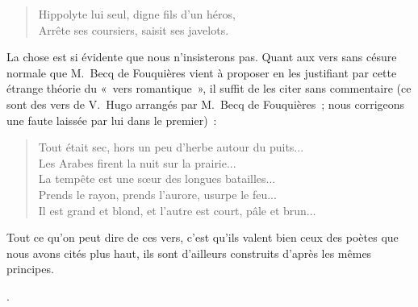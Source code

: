 \documentclass[french,twoside]{book} %
\begin{document}
{\begin{verse}
Hippolyte lui seul, digne fils d’un héros,\\
Arrête ses coursiers, saisit ses javelots.\\
\end{verse}
\par
\noindent La chose est si évidente que nous n’insisterons pas. Quant aux vers sans césure normale que M. Becq de Fouquières vient à proposer en les justifiant par cette étrange théorie du « vers romantique », il suffit de les citer sans commentaire (ce sont des vers de V. Hugo arrangés par M. Becq de Fouquières ; nous corrigeons une faute laissée par lui dans le premier) :\par

\begin{verse}
Tout était sec, hors un peu d’herbe autour du puits...\\
Les Arabes firent la nuit sur la prairie...\\
La tempête est une sœur des longues batailles...\\
Prends le rayon, prends l’aurore, usurpe le feu...\\
Il est grand et blond, et l’autre est court, pâle et brun...\\
\end{verse}
\par
\noindent Tout ce qu’on peut dire de ces vers, c’est qu’ils valent bien ceux des poètes que nous avons cités plus haut, ils sont d’ailleurs construits d’après les mêmes principes.
}.\par
\end{document}

